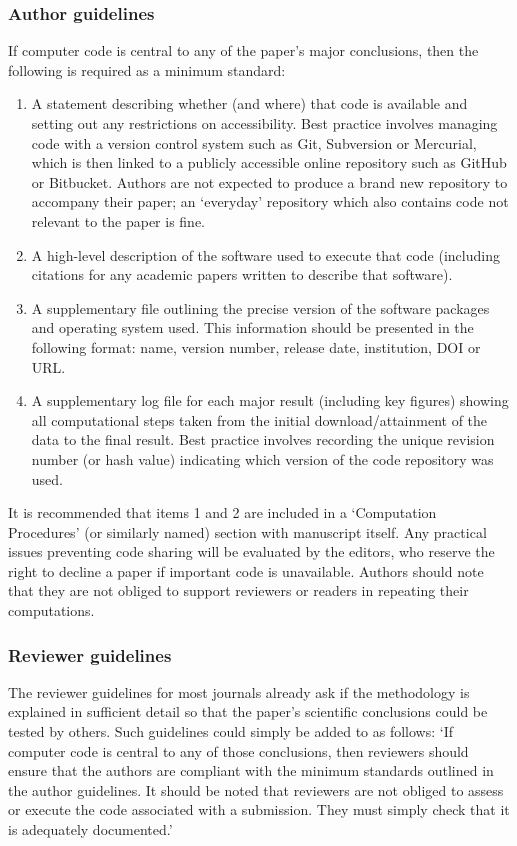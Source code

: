 \subsubsection{Author guidelines}

If computer code is central to any of the paper's major conclusions, then the following is required as a minimum standard: 
\begin{enumerate}
\item A statement describing whether (and where) that code is available and setting out any restrictions on accessibility. Best practice involves managing code with a version control system such as Git, Subversion or Mercurial, which is then linked to a publicly accessible online repository such as GitHub or Bitbucket. Authors are not expected to produce a brand new repository to accompany their paper; an `everyday' repository which also contains code not relevant to the paper is fine.  
\item A high-level description of the software used to execute that code (including citations for any academic papers written to describe that software).
\item A supplementary file outlining the precise version of the software packages and operating system used. This information should be presented in the following format: name, version number, release date, institution, DOI or URL.
\item A supplementary log file for each major result (including key figures) showing all computational steps taken from the initial download/attainment of the data to the final result. Best practice involves recording the unique revision number (or hash value) indicating which version of the code repository was used. 
\end{enumerate}

It is recommended that items 1 and 2 are included in a `Computation Procedures' (or similarly named) section with manuscript itself. Any practical issues preventing code sharing will be evaluated by the editors, who reserve the right to decline a paper if important code is unavailable. Authors should note that they are not obliged to support reviewers or readers in repeating their computations.

\subsubsection{Reviewer guidelines}

The reviewer guidelines for most journals already ask if the methodology is explained in sufficient detail so that the paper's scientific conclusions could be tested by others. Such guidelines could simply be added to as follows: `If computer code is central to any of those conclusions, then reviewers should ensure that the authors are compliant with the minimum standards outlined in the author guidelines. It should be noted that reviewers are not obliged to assess or execute the code associated with a submission. They must simply check that it is adequately documented.'   
  
 
    
  
  
  
  
  
  
  
  
  
